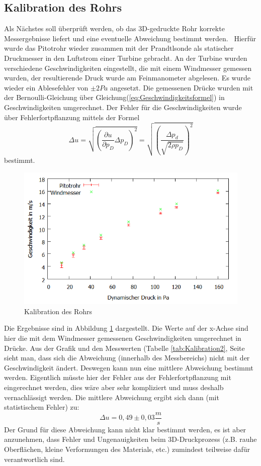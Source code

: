\subsection{Kalibration des Rohrs}
Als Nächstes soll überprüft werden, ob das 3D-gedruckte Rohr korrekte Messergebnisse liefert und eine eventuelle Abweichung bestimmt werden.
\
Hierfür wurde das Pitotrohr wieder zusammen mit der Prandtlsonde als statischer Druckmesser in den Luftstrom einer Turbine gebracht. An der Turbine wurden verschiedene Geschwindigkeiten eingestellt, die mit einem Windmesser gemessen wurden, der resultierende Druck wurde am Feinmanometer abgelesen. Es wurde wieder ein Ablesefehler von $\pm 2 Pa$ angesetzt. Die gemessenen Drücke wurden mit der Bernoulli-Gleichung über Gleichung(\ref{eq:Geschwindigkeitsformel}) in Geschwindigkeiten umgerechnet.
Der Fehler für die Geschwindigkeiten wurde über Fehlerfortpflanzung mittels der Formel
\begin{equation}
\Delta u=\sqrt{(\frac{\partial u}{\partial p_D}\Delta p_D)^2}=\sqrt{(\frac{\Delta p_d}{\sqrt{2\rho p_D}})^2}
\label{eq:Fehlerfortpflanzung}
\end{equation}
bestimmt.
\begin{figure}
      \includegraphics[width=.9\textwidth]{images/Kalibration}
\caption{Kalibration des Rohrs}
\label{fig:Kalibration}
\end{figure}
Die Ergebnisse sind in Abbildung \ref{fig:Kalibration} dargestellt. Die Werte auf der x-Achse sind hier die mit dem Windmesser gemessenen Geschwindigkeiten umgerechnet in Drücke. Aus der Grafik und den Messwerten (Tabelle \ref{tab:Kalibration2}, Seite \pageref{tab:Kalibration2} sieht man, dass sich die Abweichung (innerhalb des Messbereichs) nicht mit der Geschwindigkeit ändert. Deswegen kann nun eine mittlere Abweichung bestimmt werden. Eigentlich müsste hier der Fehler aus der Fehlerfortpflanzung mit eingerechnet werden, dies wäre aber sehr kompliziert und muss deshalb vernachlässigt werden. Die mittlere Abweichung ergibt sich dann (mit statistischem Fehler) zu:
\begin{equation}
\Delta u= 0,49 \pm 0,03 \frac{m}{s}
\label{eq:Abweichung}
\end{equation}
Der Grund für diese Abweichung kann nicht klar bestimmt werden, es ist aber anzunehmen, dass Fehler und Ungenauigkeiten beim 3D-Druckprozess (z.B. rauhe Oberflächen, kleine Verformungen des Materials, etc.) zumindest teilweise dafür verantwortlich sind.
